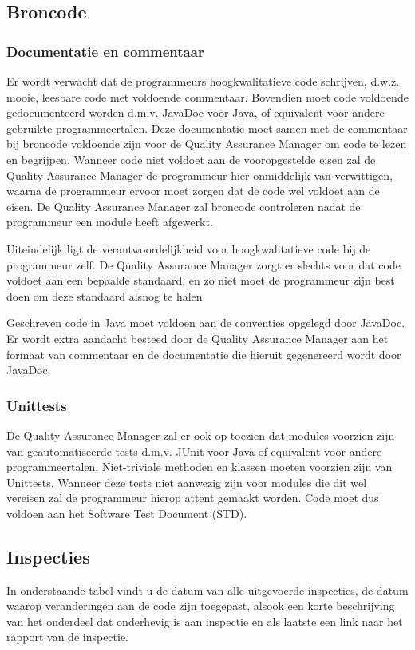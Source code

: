 \subsection{Broncode}
\subsubsection{Documentatie en commentaar}
Er wordt verwacht dat de programmeurs hoogkwalitatieve code schrijven, d.w.z. mooie, leesbare code met voldoende commentaar. Bovendien moet code voldoende gedocumenteerd worden d.m.v. JavaDoc voor Java, of equivalent voor andere gebruikte programmeertalen. Deze documentatie moet samen met de commentaar bij broncode voldoende zijn voor de Quality Assurance Manager om code te lezen en begrijpen. Wanneer code niet voldoet aan de vooropgestelde eisen zal de Quality Assurance Manager de programmeur hier onmiddelijk van verwittigen, waarna de programmeur ervoor moet zorgen dat de code wel voldoet aan de eisen. De Quality Assurance Manager zal broncode controleren nadat de programmeur een module heeft afgewerkt. 

Uiteindelijk ligt de verantwoordelijkheid voor hoogkwalitatieve code bij de programmeur zelf. De Quality Assurance Manager zorgt er slechts voor dat code voldoet aan een bepaalde standaard, en zo niet moet de programmeur zijn best doen om deze standaard alsnog te halen. 

Geschreven code in Java moet voldoen aan de conventies opgelegd door JavaDoc\cite{JavaDocConventies}. Er wordt extra aandacht besteed door de Quality Assurance Manager aan het formaat van commentaar en de documentatie die hieruit gegenereerd wordt door JavaDoc. 

\subsubsection{Unittests}
De Quality Assurance Manager zal er ook op toezien dat modules voorzien zijn van geautomatiseerde tests d.m.v. JUnit voor Java of equivalent voor andere programmeertalen. Niet-triviale methoden en klassen moeten voorzien zijn van Unittests. Wanneer deze tests niet aanwezig zijn voor modules die dit wel vereisen zal de programmeur hierop attent gemaakt worden. Code moet dus voldoen aan het Software Test Document (STD). 

\subsection{Inspecties}
In onderstaande tabel vindt u de datum van alle uitgevoerde inspecties, de datum waarop veranderingen aan de code zijn toegepast, alsook een korte beschrijving van het onderdeel dat onderhevig is aan inspectie en als laatste een link naar het rapport van de inspectie.

